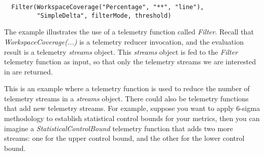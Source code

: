 \begin{verbatim}
  Filter(WorkspaceCoverage("Percentage", "**", "line"), 
         "SimpleDelta", filterMode, threshold) 
\end{verbatim}

The example illustrates the use of a telemetry function called \textit{Filter}. Recall that \textit{WorkspaceCoverage(...)} is a telemetry reducer invocation, and the evaluation result is a telemetry \textit{streams} object. This \textit{streams} object is fed to the \textit{Filter} telemetry function as input, so that only the telemetry streams we are interested in are returned.

This is an example where a telemetry function is used to reduce the number of telemetry streams in a \textit{streams} object. There could also be telemetry functions that add new telemetry streams. For example, suppose you want to apply 6-sigma methodology to establish statistical control bounds for your metrics, then you can imagine a \textit{StatisticalControlBound} telemetry function that adds two more streams: one for the upper control bound, and the other for the lower control bound. 
         

 
%
%  
%  
%  
 
 
 
 
 
 
 
